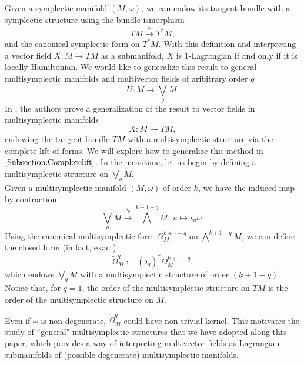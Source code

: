 Given a symplectic manifold $(M, \omega)$, we can endow its tangent bundle with a symplectic structure using the bundle ismorphism $$TM \xrightarrow{\flat} T^\ast M,$$ and the canonical symplectic form on $T^\ast M.$ With this definition and interpreting a vector field $X: M \rightarrow TM$ as a submanifold, $X$ is $1$-Lagrangian if and only if it is locally Hamiltonian. We would like to generalize this result to general multisymplectic manifolds and multivector fields of aribitrary order $q$ $$U:M\rightarrow \bigvee_qM.$$ In \cite{HamiltonianStructuresIbort}, the authors prove a generalization of the result to vector fields in multisymplectic manifolds $$X: M \rightarrow TM,$$ endowing the tangent bundle $TM$ with a multisymplectic structure via the complete lift of forms. We will explore how to generalize this method in $\cref{Subsection:Completelift}$. In the meantime, let us begin by defining a multisymplectic structure on $\bigvee_q M.$\\

Given a multisymplectic manifold $(M, \omega)$ of order $k$, we have the induced map by contraction $$\bigvee_q M \xrightarrow{\flat_q} \bigwedge^{k+1-q} M;\, u \mapsto \iota_u \omega.$$ Using the canonical multisymplectic form $\Omega_M^{k + 1 - q}$ on $\bigwedge^{k + 1 - q} M$, we can define the closed form (in fact, exact)$$\widetilde{\Omega}^q_M := (\flat_q)^\ast \Omega_M^{k +1 - q},$$ which endows $\bigvee_q M$ with a multisymplectic structure of order $(k + 1 - q)$. Notice that, for $q = 1$, the order of the multisymplectic structure on $TM$ is the order of the multisymplectic structure on $M$.

\begin{remark} Even if $\omega$ is non-degenerate, $\widetilde\Omega_M^q$ could have non trivial kernel. This motivates the study of ``general" multisymplectic structures that we have adopted along this paper, which provides a way of interpreting multivector fields as Lagrangian submanifolds of (possible degenerate)  multisymplectic manifolds.
\end{remark}


